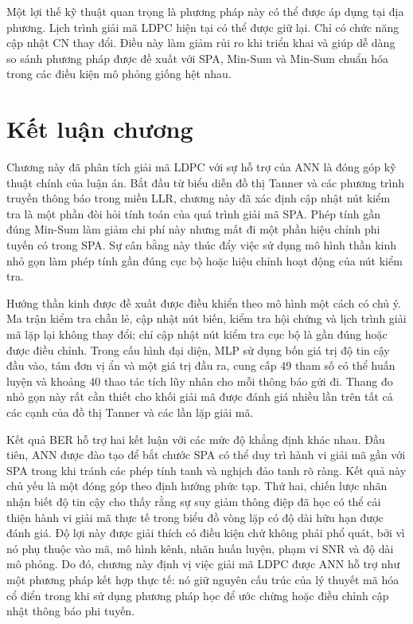 Một lợi thế kỹ thuật quan trọng là phương pháp này có thể được áp dụng tại địa phương. Lịch trình giải mã LDPC hiện tại có thể được giữ lại. Chỉ có chức năng cập nhật CN thay đổi. Điều này làm giảm rủi ro khi triển khai và giúp dễ dàng so sánh phương pháp được đề xuất với SPA, Min-Sum và Min-Sum chuẩn hóa trong các điều kiện mô phỏng giống hệt nhau.




\section{Kết luận chương}
Chương này đã phân tích giải mã LDPC với sự hỗ trợ của ANN là đóng góp kỹ thuật chính của luận án. Bắt đầu từ biểu diễn đồ thị Tanner và các phương trình truyền thông báo trong miền LLR, chương này đã xác định cập nhật nút kiểm tra là một phần đòi hỏi tính toán của quá trình giải mã SPA. Phép tính gần đúng Min-Sum làm giảm chi phí này nhưng mất đi một phần hiệu chỉnh phi tuyến có trong SPA. Sự cân bằng này thúc đẩy việc sử dụng mô hình thần kinh nhỏ gọn làm phép tính gần đúng cục bộ hoặc hiệu chỉnh hoạt động của nút kiểm tra.

Hướng thần kinh được đề xuất được điều khiển theo mô hình một cách có chủ ý. Ma trận kiểm tra chẵn lẻ, cập nhật nút biến, kiểm tra hội chứng và lịch trình giải mã lặp lại không thay đổi; chỉ cập nhật nút kiểm tra cục bộ là gần đúng hoặc được điều chỉnh. Trong cấu hình đại diện, MLP sử dụng bốn giá trị độ tin cậy đầu vào, tám đơn vị ẩn và một giá trị đầu ra, cung cấp 49 tham số có thể huấn luyện và khoảng 40 thao tác tích lũy nhân cho mỗi thông báo gửi đi. Thang đo nhỏ gọn này rất cần thiết cho khối giải mã được đánh giá nhiều lần trên tất cả các cạnh của đồ thị Tanner và các lần lặp giải mã.

Kết quả BER hỗ trợ hai kết luận với các mức độ khẳng định khác nhau. Đầu tiên, ANN được đào tạo để bắt chước SPA có thể duy trì hành vi giải mã gần với SPA trong khi tránh các phép tính tanh và nghịch đảo tanh rõ ràng. Kết quả này chủ yếu là một đóng góp theo định hướng phức tạp. Thứ hai, chiến lược nhãn nhận biết độ tin cậy cho thấy rằng sự suy giảm thông điệp đã học có thể cải thiện hành vi giải mã thực tế trong biểu đồ vòng lặp có độ dài hữu hạn được đánh giá. Độ lợi này được giải thích có điều kiện chứ không phải phổ quát, bởi vì nó phụ thuộc vào mã, mô hình kênh, nhãn huấn luyện, phạm vi SNR và độ dài mô phỏng. Do đó, chương này định vị việc giải mã LDPC được ANN hỗ trợ như một phương pháp kết hợp thực tế: nó giữ nguyên cấu trúc của lý thuyết mã hóa cổ điển trong khi sử dụng phương pháp học để ước chừng hoặc điều chỉnh cập nhật thông báo phi tuyến.

